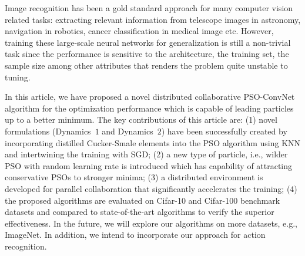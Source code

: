 \documentclass{ieeeaccess}
\begin{document}
\label{sec:conclusion}
Image recognition has been a gold standard approach for many computer vision related tasks: extracting relevant information from telescope images in astronomy, navigation in robotics, cancer classification in medical image etc. However, training these large-scale neural networks for generalization is still a non-trivial task since the performance is sensitive to the architecture, the training set, the sample size among other attributes that renders the problem quite unstable to tuning. 

In this article, we have proposed a novel distributed collaborative PSO-ConvNet algorithm for the optimization performance which is capable of leading particles up to a better minimum. The key contributions of this article are: (1) novel formulations (Dynamics~$1$ and Dynamics~$2$) have been successfully created by incorporating distilled Cucker-Smale elements into the PSO algorithm using KNN and intertwining the training with SGD; (2) a new type of particle, i.e., wilder PSO with random learning rate is introduced which has capability of attracting conservative PSOs to stronger minima; (3) a distributed environment is developed for parallel collaboration that significantly accelerates the training; (4) the proposed algorithms are evaluated on Cifar-10 and Cifar-100 benchmark datasets and compared to state-of-the-art algorithms to verify the superior effectiveness. In the future, we will explore our algorithms on more datasets, e.g., ImageNet. In addition, we intend to incorporate our approach for action recognition.
\end{document}

